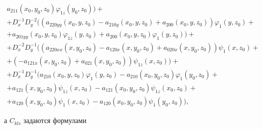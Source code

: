 \begin{gather*}
a_{211}(x_0,y_0,z_0)\varphi_{1z}(y_0,z_0))+ \\ 


% 


+D^{-1}_x D^{-2}_y((a_{220yy}(x_0,y,z_0)- 


a_{210y}(x_0,y,z_0)+a_{200}(x_0,y,z_0))\varphi_1(y,z_0)+ \\ 


% 


+a_{201yy}(x_0,y,z_0)\varphi_{1z}(y,z_0)+ 


a_{200}(x_0,y,z_0)\varphi_1(y,z_0))+ \\ 


% 


+D^{-2}_x D^{-1}_y((a_{220xx}(x,y_0,z_0)- 


a_{120x}(x,y_0,z_0)+a_{020x}(x,y_0,z_0))\psi_1(x,z_0)+ \\ 


% 


+(-a_{121x}(x,y_0,z_0)+a_{021}(x,y_0,z_0))\psi_{1z}(x,z_0))+ \\ 


% 


+D^{-1}_x D^{-1}_y(a_{210}(x_0,y,z_0)\varphi_1(y,z_0)- 


a_{210}(x_0,y_0,z_0)\varphi_1(y_0,z_0)+ \\ 


% 


+ a_{121}(x,y_0,z_0)\psi_{1z}(x,z_0)- 


a_{121}(x_0,y_0,z_0)\psi_{1z}(x_0,z_0)+ \\ 


% 


+a_{120}(x,y_0,z_0)\psi_1(x,z_0)- 


a_{120}(x_0,y_0,z_0)\psi_1(y_0,z_0)), 


\end{gather*} 


а $C_{kls}$ задаются формулами 


